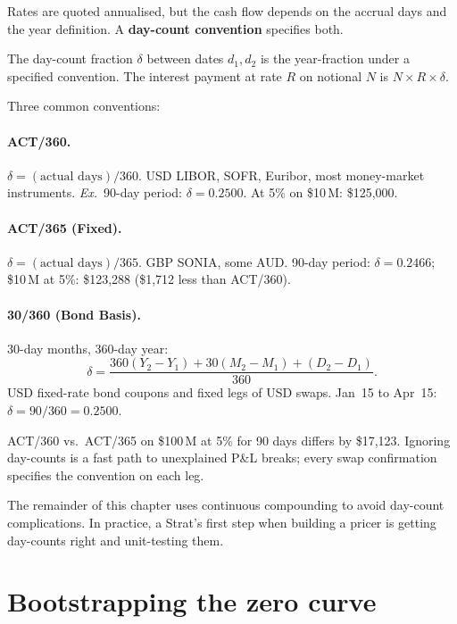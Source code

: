 Rates are quoted annualised, but the cash flow depends on the accrual
days and the year definition.  A \textbf{day-count convention}
specifies both.

\begin{definition}
The day-count fraction $\delta$ between dates $d_1,d_2$ is the
year-fraction under a specified convention.  The interest payment at
rate $R$ on notional $N$ is $N \times R \times \delta$.
\end{definition}

Three common conventions:

\paragraph{ACT/360.}
$\delta = (\text{actual days}) / 360$.  USD LIBOR, SOFR, Euribor, most
money-market instruments.  \emph{Ex.}~90-day period: $\delta = 0.2500$.
At 5\% on \$10\,M: \$125,000.

\paragraph{ACT/365 (Fixed).}
$\delta = (\text{actual days}) / 365$.  GBP SONIA, some AUD.
90-day period: $\delta = 0.2466$; \$10\,M at 5\%: \$123,288
(\$1,712 less than ACT/360).

\paragraph{30/360 (Bond Basis).}
30-day months, 360-day year:
\[
  \delta = \frac{360(Y_2-Y_1) + 30(M_2-M_1) + (D_2-D_1)}{360}.
\]
USD fixed-rate bond coupons and fixed legs of USD swaps.
Jan~15 to Apr~15: $\delta = 90/360 = 0.2500$.

\begin{pitfallbox}
ACT/360 vs.\ ACT/365 on \$100\,M at 5\% for 90 days differs by
\$17,123.  Ignoring day-counts is a fast path to unexplained P\&L
breaks; every swap confirmation specifies the convention on each leg.
\end{pitfallbox}

The remainder of this chapter uses continuous compounding to avoid
day-count complications.  In practice, a Strat's first step when
building a pricer is getting day-counts right and unit-testing them.


\section{Bootstrapping the zero curve}
\label{sec:fi_bootstrap}

